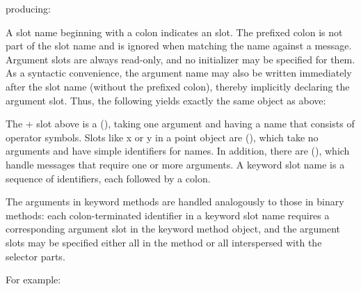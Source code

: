 \documentclass[letterpaper,10pt,english]{sphinxmanual}
\begin{document}
producing:
\begin{figure}[htbp]
\centering

\noindent{}
\end{figure}

A slot name beginning with a colon indicates an  slot. The prefixed colon is not part of the slot name and is ignored when matching the name against a message. Argument slots are always read-only, and no initializer may be specified for them. As a syntactic convenience, the argument name may also be written immediately after the slot name (without the prefixed colon), thereby implicitly declaring the argument slot. Thus, the following yields exactly the same object as above:

\begin{sphinxVerbatim}[commandchars=\\\{\}]
 
                     
 
\end{sphinxVerbatim}

The + slot above is a  ({\hyperref[\detokenize{langref:pp-binary-messages}]{}}), taking one argument and having a name that consists of operator symbols. Slots like x or y in a point object are  ({\hyperref[\detokenize{langref:pp-unary-messages}]{}}), which take no arguments and have simple identifiers for names. In addition, there are  ({\hyperref[\detokenize{langref:pp-keyword-messages}]{}}), which handle messages that require one or more arguments. A keyword slot name is a sequence of identifiers, each followed by a colon.

The arguments in keyword methods are handled analogously to those in binary methods: each colon-terminated identifier in a keyword slot name requires a corresponding argument slot in the keyword method object, and the argument slots may be specified either all in the method or all interspersed with the selector parts.

For example:
\end{document}
